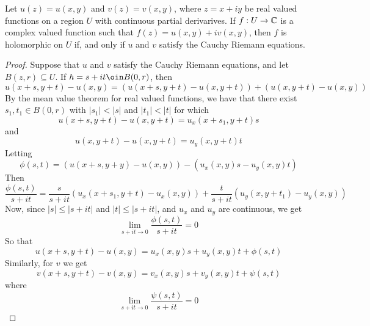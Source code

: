 \begin{theorem}\label{3.2.11}
    Let $u(z)=u(x,y)$ and $v(z)=v(x,y)$, where $z=x+iy$ be real valued
    functions on a region $U$ with continuous partial derivarives. If $f:U
    \xrightarrow{} \mathbb{C}$ is a complex valued function such that
    $f(z)=u(x,y)+iv(x,y)$, then $f$ is holomorphic on $U$ if, and only if $u$ and
    $v$ satisfy the Cauchy Riemann equations.
\end{theorem}
\begin{proof}
    Suppose that $u$ and  $v$ satisfy the Cauchy Riemann equations, and let
    $B(z,r) \subseteq U$. If $h=s+it \oin B(0,r)$, then
    \begin{equation*}
        u(x+s,y+t)-u(x,y)=(u(x+s,y+t)-u(x,y+t))+(u(x,y+t)-u(x,y))
    \end{equation*}
    By the mean value theorem for real valued functions, we have that there
    exist $s_1, t_1 \in B(0,r)$ with $|s_1|<|s|$ and $|t_1|<|t|$ for which
    \begin{equation*}
        u(x+s,y+t)-u(x,y+t)=u_x(x+s_1,y+t)s
    \end{equation*}
    and
    \begin{equation*}
        u(x,y+t)-u(x,y+t)=u_y(x,y+t)t
    \end{equation*}
    Letting
    \begin{equation*}
        \phi(s,t)=(u(x+s,y+y)-u(x,y))-(u_x(x,y)s-u_y(x,y)t)
    \end{equation*}
    Then
    \begin{equation*}
        \frac{\phi(s,t)}{s+it}=\frac{s}{s+it}(u_x(x+s_1,y+t)-u_x(x,y))+
        \frac{t}{s+it}(u_y(x,y+t_1)-u_y(x,y))
    \end{equation*}
    Now, since $|s| \leq |s+it|$ and  $|t| \leq |s+it|$, and  $u_x$ and  $u_y$
    are continuous, we get
    \begin{equation*}
        \lim_{s+it \xrightarrow{} 0}{\frac{\phi(s,t)}{s+it}}=0
    \end{equation*}
    So that
    \begin{equation*}
        u(x+s,y+t)-u(x,y)=u_x(x,y)s+u_y(x,y)t+\phi(s,t)
    \end{equation*}
    Similarly, for $v$ we get
    \begin{equation*}
        v(x+s,y+t)-v(x,y)=v_x(x,y)s+v_y(x,y)t+\psi(s,t)
    \end{equation*}
    where
    \begin{equation*}
        \lim_{s+it \xrightarrow{} 0}{\frac{\psi(s,t)}{s+it}}=0
    \end{equation*}


\end{proof}
